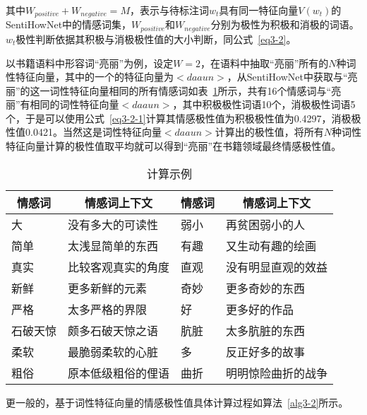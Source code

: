 其中$W_{positive}+W_{negative}=M$，表示与待标注词$w_t$具有同一特征向量$ V(w_t) $的SentiHowNet中的情感词集，$W_{positive}$和$W_{negative}$分别为极性为积极和消极的词语。$w_t$极性判断依据其积极与消极极性值的大小判断，同公式~\ref{eq3-2}。

以书籍语料中形容词“亮丽”为例，设定$ W=2 $，在语料中抽取“亮丽”所有的$ N $种词性特征向量，其中的一个的特征向量为$ <daaun> $，从SentiHowNet中获取与“亮丽”的这一词性特征向量相同的所有情感词如表~\ref{tab3-3-1}所示，共有16个情感词与“亮丽”有相同的词性特征向量$ <daaun> $，其中积极极性词语10个，消极极性词语5个，于是可以使用公式~\ref{eq3-2-1}计算其情感极性值为积极极性值为0.4297，消极极性值0.0421。当然这是词性特征向量$ <daaun> $计算出的极性值，将所有$ N $种词性特征向量计算的极性值取平均就可以得到“亮丽”在书籍领域最终情感极性值。
\begin{table}[htp]
\centering
\caption{计算示例}
\label{tab3-3-1}
\begin{tabular}{|l|l|l|l|}
\hline
\multicolumn{1}{|c|}{情感词} & \multicolumn{1}{c|}{情感词上下文} & \multicolumn{1}{c|}{情感词} & \multicolumn{1}{c|}{情感词上下文} \\ \hline
大 & 没有多大的可读性 & 弱小 & 再贫困弱小的人 \\ \hline
简单 & 太浅显简单的东西 & 有趣 & 又生动有趣的绘画 \\ \hline
真实 & 比较客观真实的角度 & 直观 & 没有明显直观的效益 \\ \hline
新鲜 & 更多新鲜的元素 & 奇妙 & 更多奇妙的东西 \\ \hline
严格 & 太多严格的界限 & 好 & 更多好的作品 \\ \hline
石破天惊 & 颇多石破天惊之语 & 肮脏 & 太多肮脏的东西 \\ \hline
柔软 & 最脆弱柔软的心脏 & 多 & 反正好多的故事 \\ \hline
粗俗 & 原本低级粗俗的俚语 & 曲折 & 明明惊险曲折的战争 \\ \hline
\end{tabular}
\end{table}

更一般的，基于词性特征向量的情感极性值具体计算过程如算法~\ref{alg3-2}所示。

